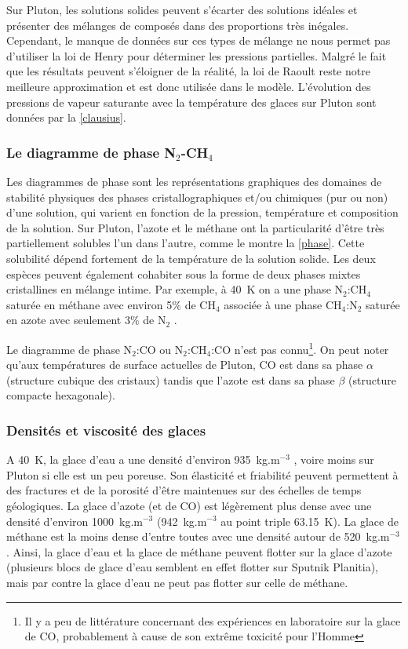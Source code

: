 Sur Pluton, les solutions solides peuvent s’écarter des solutions idéales et présenter des mélanges de composés dans des proportions très inégales. Cependant, le manque de données sur ces types de mélange ne nous permet pas d’utiliser la loi de Henry pour déterminer les pressions partielles. Malgré le fait que les résultats peuvent s’éloigner de la réalité, la loi de Raoult reste notre meilleure approximation et est donc utilisée dans le modèle. L’évolution des pressions de vapeur saturante avec la température des glaces sur Pluton sont données par la \autoref{clausius}. 

\subsubsection{Le diagramme de phase N$_2$-CH$_4$}

Les diagrammes de phase sont les représentations graphiques des domaines de stabilité physiques des phases cristallographiques et/ou chimiques (pur ou non) d’une solution, qui varient en fonction de la pression, température et composition de la solution. 
Sur Pluton, l’azote et le méthane ont la particularité d’être très partiellement solubles l’un dans l’autre, comme le montre la \autoref{phase}. Cette solubilité dépend fortement de la température de la solution solide. Les deux espèces peuvent également cohabiter sous la forme de deux phases mixtes cristallines en mélange intime. Par exemple, à 40~K on a une phase N$_2$:CH$_4$ saturée en méthane avec environ 5$\%$ de CH$_4$ associée à une phase CH$_4$:N$_2$ saturée en azote avec seulement 3$\%$ de N$_2$ \citep{Prot:15}. 

Le diagramme de phase N$_2$:CO ou N$_2$:CH$_4$:CO n'est pas connu\footnote{Il y a peu de littérature concernant des expériences en laboratoire sur la glace de CO, probablement à cause de son extrême toxicité pour l'Homme}. On peut noter qu'aux températures de surface actuelles de Pluton, CO est dans sa phase $\alpha$ (structure cubique des cristaux) tandis que l'azote est dans sa phase $\beta$ (structure compacte hexagonale).

\subsubsection{Densités et viscosité des glaces}

A 40~K, la glace d’eau a une densité d’environ 935~kg.m$^{-3}$ \citep{Moor:16}, voire moins sur Pluton si elle est un peu poreuse. Son élasticité et friabilité peuvent permettent à des fractures et de la porosité d’être maintenues sur des échelles de temps géologiques. La glace d’azote (et de CO) est légèrement plus dense avec une densité d'environ 1000~kg.m$^{-3}$ (942~kg.m$^{-3}$ au point triple 63.15~K). La glace de méthane est la moins dense d'entre toutes avec une densité autour de 520~kg.m$^{-3}$ \citep{Leyr:16}. Ainsi, la glace d’eau et la glace de méthane peuvent flotter sur la glace d’azote (plusieurs blocs de glace d’eau semblent en effet flotter sur Sputnik Planitia), mais par contre la glace d'eau ne peut pas flotter sur celle de méthane. 

